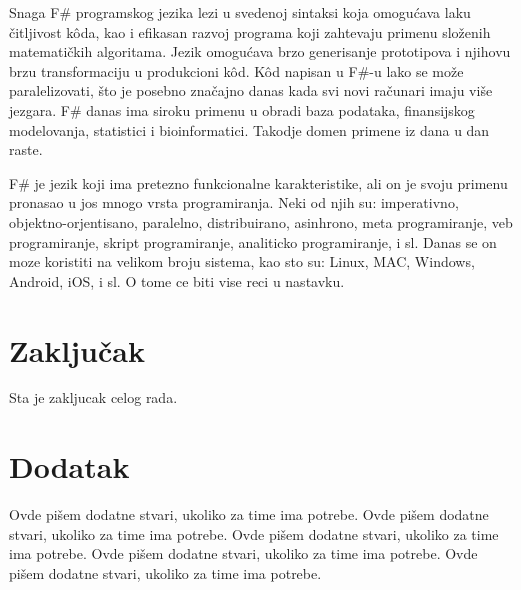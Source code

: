 \documentclass[a4paper]{article}
\begin{document}
Snaga F$\#$ programskog jezika lezi u svedenoj sintaksi koja omogućava laku čitljivost kôda, kao i efikasan razvoj programa koji zahtevaju primenu složenih matematičkih algoritama. Jezik omogućava brzo generisanje prototipova i njihovu brzu transformaciju u produkcioni kôd. Kôd napisan u F$\#$-u lako se može paralelizovati, što je posebno značajno danas kada svi novi računari imaju više jezgara. F$\#$ danas ima siroku primenu u obradi baza podataka, finansijskog modelovanja, statistici i bioinformatici. Takodje domen primene iz dana u dan raste.

F$\#$ je jezik koji ima pretezno funkcionalne karakteristike, ali on je svoju primenu pronasao u jos mnogo vrsta programiranja. Neki od njih su: imperativno, objektno-orjentisano, paralelno, distribuirano, asinhrono, meta programiranje, veb programiranje, skript programiranje, analiticko programiranje, i sl. Danas se on moze koristiti na velikom broju sistema, kao sto su: Linux, MAC, Windows, Android, iOS, i sl. O tome ce biti vise reci u nastavku. 

\section{Zaključak}
\label{sec:zakljucak}

Sta je zakljucak celog rada.

\appendix
 


\appendix
\section{Dodatak}
Ovde pišem dodatne stvari, ukoliko za time ima potrebe.
Ovde pišem dodatne stvari, ukoliko za time ima potrebe.
Ovde pišem dodatne stvari, ukoliko za time ima potrebe.
Ovde pišem dodatne stvari, ukoliko za time ima potrebe.
Ovde pišem dodatne stvari, ukoliko za time ima potrebe.
\end{document}
